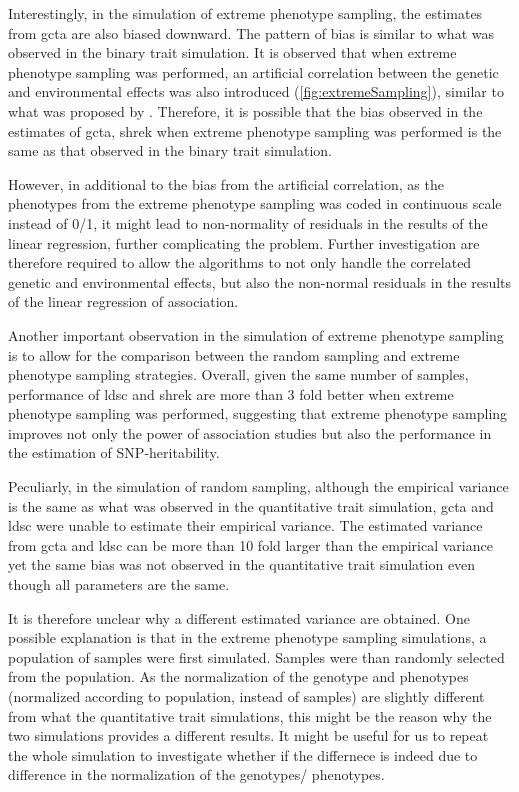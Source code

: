 \documentclass[12pt]{scrbook}
\begin{document}
Interestingly, in the simulation of extreme phenotype sampling, the estimates from \gls{gcta} are also biased downward.
The pattern of bias is similar to what was observed in the binary trait simulation.
It is observed that when extreme phenotype sampling was performed, an artificial correlation between the genetic and environmental effects was also introduced (\cref{fig:extremeSampling}), similar to what was proposed by \citet{Golan2014}.
Therefore, it is possible that the bias observed in the estimates of \gls{gcta}, \gls{shrek} when extreme phenotype sampling was performed is the same as that observed in the binary trait simulation. 

However, in additional to the bias from the artificial correlation, as the phenotypes from the extreme phenotype sampling was coded in continuous scale instead of 0/1, it might lead to non-normality of residuals in the results of the linear regression, further complicating the problem.
Further investigation are therefore required to allow the algorithms to not only handle the correlated genetic and environmental effects, but also the non-normal residuals in the results of the linear regression of association.

Another important observation in the simulation of extreme phenotype sampling is to allow for the comparison between the random sampling and extreme phenotype sampling strategies. 
Overall, given the same number of samples, performance of \gls{ldsc} and \gls{shrek} are more than 3 fold better when extreme phenotype sampling was performed, suggesting that extreme phenotype sampling improves not only the power of association studies but also the performance in the estimation of \gls{SNP}-heritability.

Peculiarly, in the simulation of random sampling, although the empirical variance is the same as what was observed in the quantitative trait simulation, \gls{gcta} and \gls{ldsc} were unable to estimate their empirical variance. 
The estimated variance from \gls{gcta} and \gls{ldsc} can be more than 10 fold larger than the empirical variance yet the same bias was not observed in the quantitative trait simulation even though all parameters are the same. 

It is therefore unclear why a different estimated variance are obtained. 
One possible explanation is that in the extreme phenotype sampling simulations, a population of samples were first simulated.
Samples were than randomly selected from the population. 
As the normalization of the genotype and phenotypes (normalized according to population, instead of samples) are slightly different from what the quantitative trait simulations, this might be the reason why the two simulations provides a different results.
It might be useful for us to repeat the whole simulation to investigate whether if the differnece is indeed due to difference in the normalization of the genotypes/ phenotypes.
\end{document}
